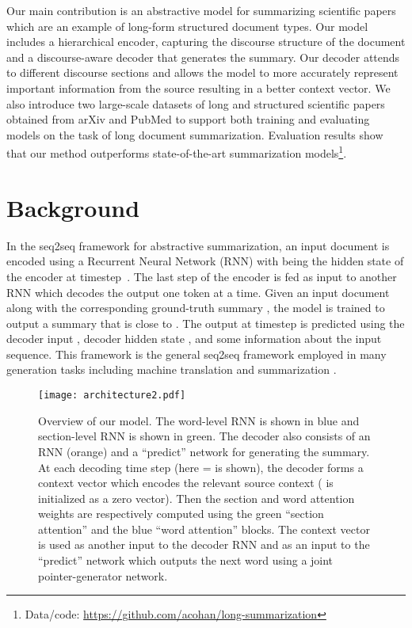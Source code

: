 \documentclass[11pt,a4paper]{article}
\begin{document}
Our main contribution is an abstractive model for summarizing scientific papers which are an example of long-form structured document types. Our model includes a hierarchical encoder, capturing the discourse structure of the document and a discourse-aware decoder that generates the summary. Our decoder attends to different discourse sections and allows the model to more accurately represent important information from the source resulting in a better context vector.
We also introduce two large-scale datasets of long and structured scientific papers obtained from arXiv and PubMed to support both training and evaluating models on the task of long document summarization. Evaluation results show that our method outperforms state-of-the-art summarization models\footnote{\small {} Data/code: \url{https://github.com/acohan/long-summarization}}.


\section{Background}

In the seq2seq framework for abstractive summarization, an input document  is encoded using a Recurrent Neural Network (RNN) with  being the hidden state of the encoder at timestep~. The last step of the encoder is fed as input to another RNN which decodes the output one token at a time. Given an input document along with the corresponding ground-truth summary , the model is trained to output a summary  that is close to . The output at timestep  is predicted using the decoder input , decoder hidden state , and some information about the input sequence. This framework is the general seq2seq framework employed in many generation tasks including machine translation \cite{sutskever2014sequence,bahdanau2014neural} and summarization \cite{nallapati2016abstractive,chopra2016abstractive}.

\begin{figure}[t]
\centering
\texttt{[image: architecture2.pdf]}
\caption{Overview of our model.
The word-level RNN is shown in blue and section-level RNN is shown in green. The decoder also consists of an RNN (orange) and a ``predict'' network for generating the summary. At each decoding time step  (here = is shown), the decoder forms a context vector  which encodes the relevant source context ( is initialized as a zero vector).
Then the section and word attention weights are respectively computed using the green ``section attention'' and the blue ``word attention'' blocks.
The context vector is used as another input to the decoder RNN and as an input to the ``predict'' network which outputs the next word using a joint pointer-generator network.
}
\label{fig:arch}
\end{figure}
\end{document}
